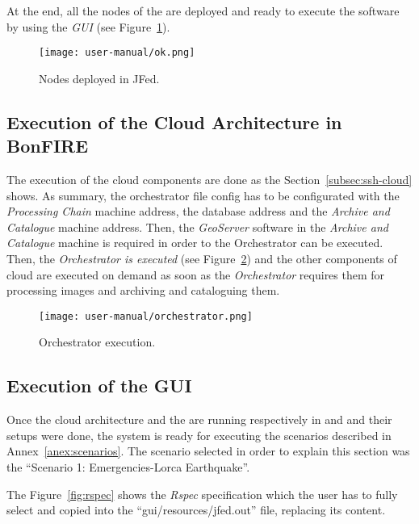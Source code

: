 At the end, all the nodes of the \sss are deployed and ready to execute the
software by using the \emph{GUI} (see Figure~\ref{fig:deployed-jfed}).

\begin{figure}[!h]
\begin{center}
\texttt{[image: user-manual/ok.png]}
\caption{Nodes deployed in JFed.}
\label{fig:deployed-jfed}
\end{center}
\end{figure}


\subsection{Execution of the Cloud Architecture in BonFIRE}

The execution of the cloud components are done as the
Section~\ref{subsec:ssh-cloud} shows. 
As summary, the orchestrator file config has to be configurated with the
\emph{Processing Chain} machine address, the database address and the \emph{Archive and Catalogue}
machine address. Then, the \emph{GeoServer} software in the \emph{Archive and
  Catalogue} machine is required in order to the Orchestrator can be
executed. Then, the \emph{Orchestrator is executed} (see Figure~\ref{fig:orch-execution}) and the
other components of cloud are executed on demand as soon as the
\emph{Orchestrator} requires them for processing images and archiving and
cataloguing them.

\begin{figure}[!h]
\begin{center}
\texttt{[image: user-manual/orchestrator.png]}
\caption{Orchestrator execution.}
\label{fig:orch-execution}
\end{center}
\end{figure}


\subsection{Execution of the GUI}

Once the cloud architecture  and the \sss are running respectively in \bonfire
and \vw and their setups were done, the system is ready for executing the
scenarios described in Annex~\ref{anex:scenarios}. The scenario selected in order to explain this
section was  the ``Scenario 1: Emergencies-Lorca Earthquake''.


The Figure~\ref{fig:rspec} shows the \emph{Rspec} specification which the user
has to fully select and copied into the ``gui/resources/jfed.out'' file,
replacing its content.

